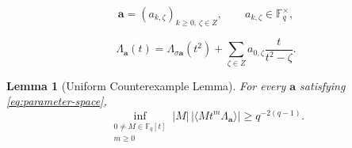 \documentclass[10pt,a4paper]{amsart}
\newtheorem{lemma}{Lemma}
\begin{document}
\begin{equation} \label{eq:parameter-space}
 \mathbf a=(a_{k,\zeta})_{k\geq0,\,\zeta\in Z},
 \qquad a_{k,\zeta}\in\mathbb F_q^\times,
\end{equation}

\begin{equation} \label{eq:parametrised-functional-equation}
 \Lambda_{\mathbf a}(t)
 =\Lambda_{\sigma\mathbf a}(t^2)
  +\sum_{\zeta\in Z}a_{0,\zeta}\frac{t}{t^2-\zeta}.
\end{equation}

\begin{lemma}[Uniform Counterexample Lemma]\label{un_contrex_lemma_tadic}
For every $\mathbf a$ satisfying \eqref{eq:parameter-space},
\begin{equation} \label{eq:uniform-parametrised-bound}
 \inf_{\substack{0\ne M\in\mathbb F_q[t]\\m\geq0}}
 |M|\,|\langle Mt^m\Lambda_{\mathbf a}\rangle|
 \geq q^{-2(q-1)}.
\end{equation}
\end{lemma}
\end{document}
